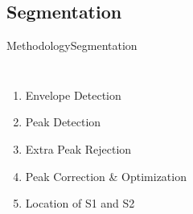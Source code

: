 \documentclass[10pt]{beamer}
\begin{document}

\subsection{Segmentation}

\begin{frame}{Methodology}{Segmentation}
\begin{columns}
	\begin{enumerate}
		\item Envelope Detection
		\item Peak Detection
		\item Extra Peak Rejection
		\item Peak Correction \& Optimization
		\item Location of S1 and S2
	\end{enumerate}{}
	
\end{columns}

\end{frame}
\end{document}
